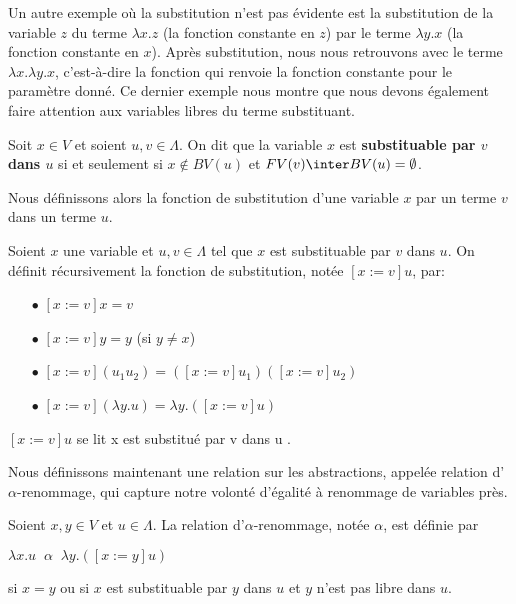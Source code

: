 Un autre exemple où la substitution n'est pas évidente est la substitution de la
variable $z$ du terme $\lambda x . z$ (la fonction constante en $z$) par le terme
$\lambda y . x$ (la fonction constante en $x$). Après substitution, nous nous
retrouvons avec le terme $\lambda x . \lambda y . x$, c'est-à-dire la fonction
qui renvoie la fonction constante pour le paramètre donné. Ce dernier exemple
nous montre que nous devons également faire attention aux variables libres du
terme substituant.

\begin{definition} 
  Soit $x \in V$ et soient $u, v \in \Lambda$. On dit que la variable $x$ est
  \textbf{substituable par $v$ dans $u$} si et seulement si $x \notin BV(u)$ et
  $FV(v) \inter BV(u) = \emptyset$.
\end{definition}

Nous définissons alors la fonction de substitution d'une variable $x$ par un
terme $v$ dans un terme $u$.

\begin{definition} 
  Soient $x$ une variable et $u, v \in \Lambda$ tel que $x$ est substituable par
  $v$ dans $u$. On définit récursivement la fonction de substitution, notée $[x := v]u$, par:
  \begin{itemize}
  \item[$\bullet$] $[x := v]x = v$
  \item[$\bullet$] $[x := v]y = y$ (si $y \neq x$)
  \item[$\bullet$] $[x := v](u_{1} u_{2}) = ([x := v]u_{1})([x := v]u_{2})$
  \item[$\bullet$] $[x := v](\lambda y . u) = \lambda y . ([x := v]u)$
  \end{itemize}
  $[x := v]u$ se lit \og x est substitué par v dans u \fg.
\end{definition}

Nous définissons maintenant une relation sur les abstractions, appelée relation d'
\textbf{$\alpha$}-renommage, qui capture
notre volonté d'égalité à renommage de variables près.

\begin{definition} 
  Soient $x, y \in V$ et $u \in \Lambda$.
  La relation d'$\alpha$-renommage, notée $\alpha$, est définie par

  \begin{math}
    \lambda x . u \;\; \alpha \;\; \lambda y . ([x := y]u)
  \end{math}

  si $x = y$ ou si $x$ est substituable par $y$ dans $u$ et $y$ n'est pas libre
  dans $u$.
\end{definition}


